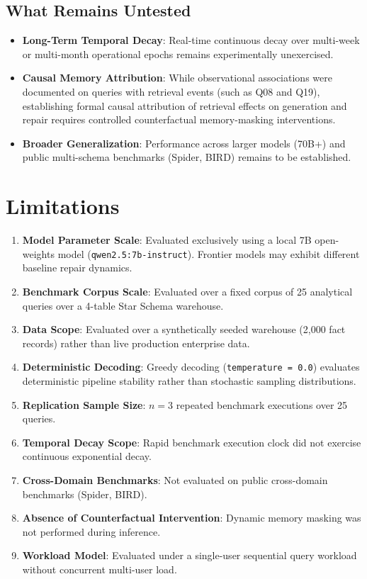 \documentclass[conference]{IEEEtran}
\begin{document}
\subsection{What Remains Untested}
\begin{itemize}
    \item \textbf{Long-Term Temporal Decay}: Real-time continuous decay over multi-week or multi-month operational epochs remains experimentally unexercised.
    \item \textbf{Causal Memory Attribution}: While observational associations were documented on queries with retrieval events (such as Q08 and Q19), establishing formal causal attribution of retrieval effects on generation and repair requires controlled counterfactual memory-masking interventions.
    \item \textbf{Broader Generalization}: Performance across larger models (70B+) and public multi-schema benchmarks (Spider, BIRD) remains to be established.
\end{itemize}

\section{Limitations}
\begin{enumerate}
    \item \textbf{Model Parameter Scale}: Evaluated exclusively using a local 7B open-weights model (\texttt{qwen2.5:7b-instruct}). Frontier models may exhibit different baseline repair dynamics.
    \item \textbf{Benchmark Corpus Scale}: Evaluated over a fixed corpus of 25 analytical queries over a 4-table Star Schema warehouse.
    \item \textbf{Data Scope}: Evaluated over a synthetically seeded warehouse (2,000 fact records) rather than live production enterprise data.
    \item \textbf{Deterministic Decoding}: Greedy decoding (\texttt{temperature = 0.0}) evaluates deterministic pipeline stability rather than stochastic sampling distributions.
    \item \textbf{Replication Sample Size}: $n = 3$ repeated benchmark executions over 25 queries.
    \item \textbf{Temporal Decay Scope}: Rapid benchmark execution clock did not exercise continuous exponential decay.
    \item \textbf{Cross-Domain Benchmarks}: Not evaluated on public cross-domain benchmarks (Spider, BIRD).
    \item \textbf{Absence of Counterfactual Intervention}: Dynamic memory masking was not performed during inference.
    \item \textbf{Workload Model}: Evaluated under a single-user sequential query workload without concurrent multi-user load.
\end{enumerate}
\end{document}
